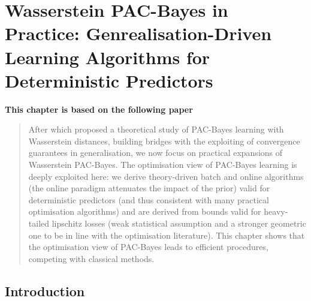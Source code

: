 \chapter[Wasserstein PAC-Bayes in Practice: Generalisation-Driven Learning Algorithms for Deterministic Predictors]{Wasserstein PAC-Bayes in Practice: Genrealisation-Driven Learning Algorithms for Deterministic Predictors}
\label{chap: wpb-practical}
\addchapterlof
\addchapterloe

\vspace{-2.0cm}
\begin{center}
\textbf{This chapter is based on the following paper}\\[-0.1cm]
\end{center}

\vspace{0.2cm}
\minitoc 

\begin{abstract}
\vspace{-0.2cm}
After  which proposed a theoretical study of PAC-Bayes learning with Wasserstein distances, building bridges with the exploiting of convergence guarantees in generalisation, we now focus on practical expansions of Wasserstein PAC-Bayes. The optimisation view of PAC-Bayes learning is deeply exploited here: we derive theory-driven batch and online algorithms (the online paradigm attenuates the impact of the prior) valid for deterministic predictors (and thus consistent with many practical optimisation algorithms) and are derived from bounds valid for heavy-tailed lipschitz losses (weak statistical assumption and a stronger geometric one to be in line with the optimisation literature). This chapter shows that the optimisation view of PAC-Bayes leads to efficient procedures, competing with classical methods.
\end{abstract}

\newpage
    
\section{Introduction}

